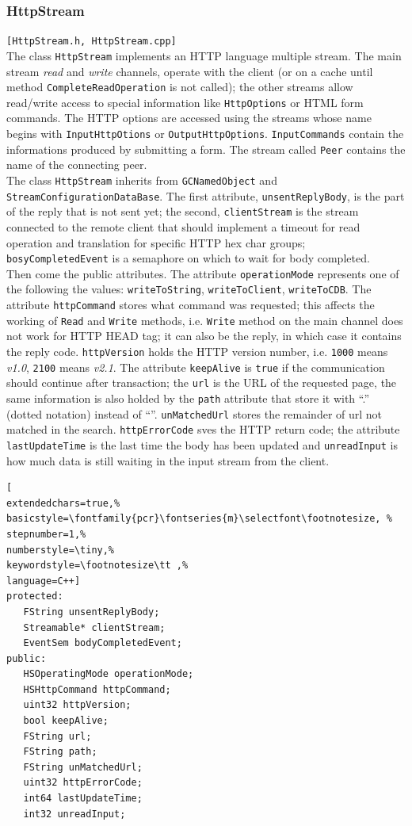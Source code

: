 \subsubsection{HttpStream}
\texttt{[HttpStream.h, HttpStream.cpp]}\\
The class \texttt{HttpStream} implements an HTTP language multiple stream. The main stream \textit{read} and \textit{write} channels, operate with the client (or on a cache until method \texttt{CompleteReadOperation} is not called); the other streams allow read/write access to special information like \texttt{HttpOptions} or HTML form commands.
The HTTP options are accessed using the streams whose name begins with \texttt{InputHttpOtions} or \texttt{OutputHttpOptions}. \texttt{InputCommands} contain the informations produced by submitting a form. The stream called \texttt{Peer} contains the name of the connecting peer.\\


The class \texttt{HttpStream} inherits from \texttt{GCNamedObject} and \texttt{StreamConfigurationDataBase}.
The first attribute, \texttt{unsentReplyBody}, is the part of the reply that is not sent yet; the second, \texttt{clientStream} is the stream connected to the remote client that should implement a timeout for read operation and translation for specific HTTP hex char groups; \texttt{bosyCompletedEvent} is a semaphore on which to wait for body completed.\\


Then come the public attributes. The attribute \texttt{operationMode} represents one of the following the values: \texttt{writeToString}, \texttt{writeToClient}, \texttt{writeToCDB}. The attribute \texttt{httpCommand} stores what command was requested; this affects the working of \texttt{Read} and \texttt{Write} methods, i.e. \texttt{Write} method on the main channel does not work for HTTP HEAD tag; it can also be the reply, in which case it contains the reply code. \texttt{httpVersion} holds the HTTP version number, i.e. \texttt{1000} means \textit{v1.0}, \texttt{2100} means \textit{v2.1}.
The attribute \texttt{keepAlive} is \texttt{true} if the communication should continue after transaction; the \texttt{url} is the URL of the requested page, the same information is also holded by the \texttt{path} attribute that store it with ``.'' (dotted notation) instead of ``\/''. \texttt{unMatchedUrl} stores the remainder of url not matched in the search. \texttt{httpErrorCode} sves the HTTP return code; the attribute \texttt{lastUpdateTime} is the last time the body has been updated and \texttt{unreadInput} is how much data is still waiting in the input stream from the client.
\begin{lstlisting}[
extendedchars=true,%
basicstyle=\fontfamily{pcr}\fontseries{m}\selectfont\footnotesize, %
stepnumber=1,%
numberstyle=\tiny,%
keywordstyle=\footnotesize\tt ,%
language=C++]
protected:
   FString unsentReplyBody;
   Streamable* clientStream;
   EventSem bodyCompletedEvent;
public:
   HSOperatingMode operationMode;
   HSHttpCommand httpCommand;
   uint32 httpVersion;
   bool keepAlive;
   FString url;
   FString path;
   FString unMatchedUrl;
   uint32 httpErrorCode;
   int64 lastUpdateTime;
   int32 unreadInput;
\end{lstlisting}



